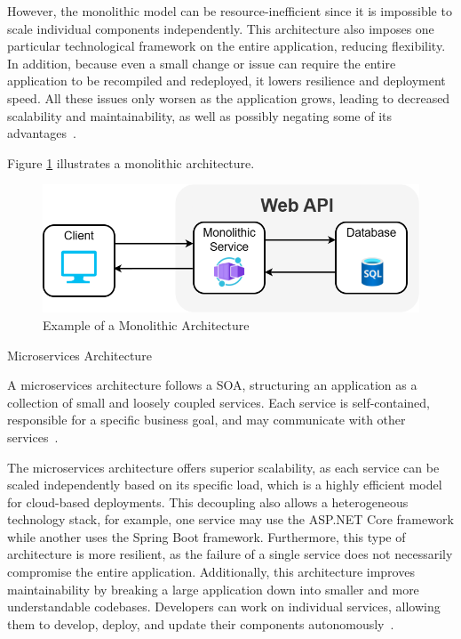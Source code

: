 \documentclass[12pt, reqno]{amsbook}
\makeatletter
\def\subsection{\@startsection{subsection}{2}%
      \z@{.5\linespacing\@plus.7\linespacing}{.25\linespacing}%
      {\normalfont\bfseries\flushleft}}
\theoremstyle{definition}
\theoremstyle{definition}
\numberwithin{section}{chapter}
\numberwithin{table}{chapter}
\numberwithin{figure}{chapter}
\makeatother
\begin{document}
However, the monolithic model can be resource-inefficient since it is impossible to scale individual components independently. This architecture also imposes one particular technological framework on the entire application, reducing flexibility. In addition, because even a small change or issue can require the entire application to be recompiled and redeployed, it lowers resilience and deployment speed. All these issues only worsen as the application grows, leading to decreased scalability and maintainability, as well as possibly negating some of its advantages~\cite{Taibi2018, Adrio2023, Moysiadis2022, Figueira2024, Kenan2020, Villamizar2015}.

Figure \ref{Figure:Monolithic_Architecture} illustrates a monolithic architecture.

\FloatBarrier
\begin{figure}[H]
  \includegraphics[width=0.85\linewidth]{images/MonolithicArchitecture.png}
  \caption{\label{Figure:Monolithic_Architecture}Example of a Monolithic Architecture}
\end{figure}
\FloatBarrier

\subsection{Microservices Architecture}
\label{Subsection:Microservices_Architecture}

A microservices architecture follows a \ac{SOA}, structuring an application as a collection of small and loosely coupled services. Each service is self-contained, responsible for a specific business goal, and may communicate with other services~\cite{Taibi2018, Adrio2023, Moysiadis2022, Khalfaoui2025, Figueira2024, Kenan2020}.

The microservices architecture offers superior scalability, as each service can be scaled independently based on its specific load, which is a highly efficient model for cloud-based deployments. This decoupling also allows a heterogeneous technology stack, for example, one service may use the ASP.NET Core framework while another uses the Spring Boot framework. Furthermore, this type of architecture is more resilient, as the failure of a single service does not necessarily compromise the entire application. Additionally, this architecture improves maintainability by breaking a large application down into smaller and more understandable codebases. Developers can work on individual services, allowing them to develop, deploy, and update their components autonomously~\cite{Taibi2018, Adrio2023, Moysiadis2022, Khalfaoui2025, Figueira2024, Kenan2020, Villamizar2015}.
\end{document}
